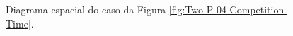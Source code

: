 \documentclass{article}
\begin{document}
	\begin{figure}[h]
		\centering
		\qquad
		\caption{Diagrama espacial do caso da Figura \ref{fig:Two-P-04-Competition-Time}.}
		\label{fig:Two-P-06-Competition-Space}
	\end{figure}	
	
\end{document}

